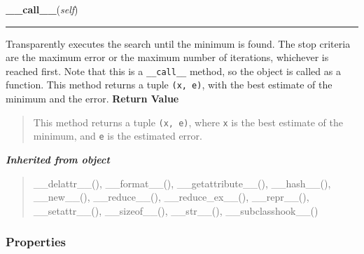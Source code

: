 \hspace{.8\funcindent}\begin{boxedminipage}{\funcwidth}

    \raggedright \textbf{\_\_call\_\_}(\textit{self})

    \vspace{-1.5ex}

    \rule{\textwidth}{0.5\fboxrule}
\setlength{\parskip}{2ex}

Transparently executes the search until the minimum is found. The stop
criteria are the maximum error or the maximum number of iterations,
whichever is reached first. Note that this is a \texttt{\_\_call\_\_} method, so
the object is called as a function. This method returns a tuple
\texttt{(x, e)}, with the best estimate of the minimum and the error.
\setlength{\parskip}{1ex}
      \textbf{Return Value}
    \vspace{-1ex}

      \begin{quote}

This method returns a tuple \texttt{(x, e)}, where \texttt{x} is the best
estimate of the minimum, and \texttt{e} is the estimated error.
      \end{quote}

    \end{boxedminipage}


\large{\textbf{\textit{Inherited from object}}}

\begin{quote}
\_\_delattr\_\_(), \_\_format\_\_(), \_\_getattribute\_\_(), \_\_hash\_\_(), \_\_new\_\_(), \_\_reduce\_\_(), \_\_reduce\_ex\_\_(), \_\_repr\_\_(), \_\_setattr\_\_(), \_\_sizeof\_\_(), \_\_str\_\_(), \_\_subclasshook\_\_()
\end{quote}


  \subsubsection{Properties}

